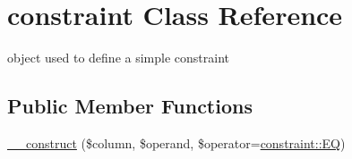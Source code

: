 \hypertarget{classconstraint}{}\section{constraint Class Reference}
\label{classconstraint}


object used to define a simple constraint  


\subsection*{Public Member Functions}
\begin{DoxyCompactItemize}
\item 
\hyperlink{classconstraint_a9e4321b5cf73af8119e6ecaac6069bbc}{\+\_\+\+\_\+construct} (\$column, \$operand, \$operator=\hyperlink{classconstraint_ac28f80db55e3b33606f846cf0b2938d5}{constraint\+::\+E\+Q})
\end{DoxyCompactItemize}
